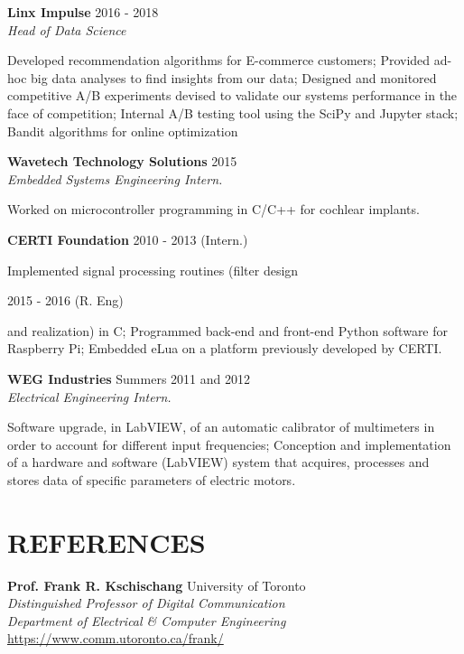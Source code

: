 \documentclass[margin, line]{res}
\begin{document}
\begin{resume}
\textbf{Linx Impulse} \hfill 2016 - 2018\\
{\sl Head of Data Science}\\
\begin{small}
    Developed recommendation algorithms for E-commerce customers; Provided ad-hoc big data analyses to find insights from our data; Designed and monitored competitive A/B experiments devised to validate our systems performance in the face of competition; Internal A/B testing tool using the SciPy and Jupyter stack; Bandit algorithms for online optimization
\end{small}

\textbf{Wavetech Technology Solutions} \hfill 2015\\
{\sl Embedded Systems Engineering Intern.}\\
\begin{small}
    Worked on microcontroller programming in C/C++ for cochlear implants.
\end{small}

\textbf{CERTI Foundation} \hfill 2010 - 2013 (Intern.)\\
\begin{small}
    Implemented signal processing routines (filter design 
\end{small}
\hfill 2015 - 2016 (R. Eng)\\ 
\begin{small}
    and realization) in C; Programmed back-end and front-end Python software for Raspberry Pi; Embedded eLua on a platform previously developed by CERTI.
\end{small}

\textbf{WEG Industries}  \hfill Summers 2011 and 2012\\
{\sl Electrical Engineering Intern.}\\
\begin{small}
    Software upgrade, in LabVIEW, of an automatic calibrator of multimeters in order to account for different input frequencies; Conception and implementation of a hardware and software (LabVIEW) system that acquires, processes and stores data of specific parameters of electric motors.
\end{small}

\section{REFERENCES}
\textbf{Prof. Frank R. Kschischang} \hfill University of Toronto\\
{\sl Distinguished Professor of Digital Communication}\\
{\sl Department of Electrical \& Computer Engineering}\\
\url{https://www.comm.utoronto.ca/frank/}


\end{resume}
\end{document}
